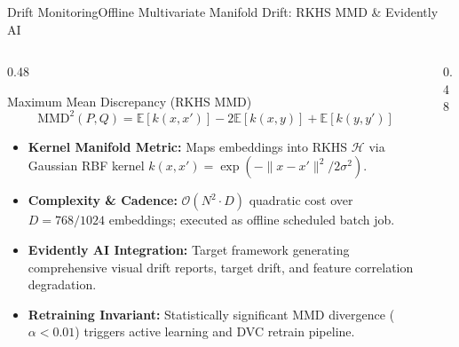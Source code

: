 \begin{frame}[fragile]{Drift Monitoring}{Offline Multivariate Manifold Drift: RKHS MMD \& Evidently AI}
    \begin{columns}[T]
        \begin{column}{0.48\textwidth}
            \begin{block}{Maximum Mean Discrepancy (RKHS MMD)}
                \vspace{-0.15cm}
                {\scriptsize $$\text{MMD}^2(P, Q) = \mathbb{E}[k(x,x')] - 2\mathbb{E}[k(x,y)] + \mathbb{E}[k(y,y')]$$}
                \vspace{-0.2cm}
                \begin{itemize}\tiny
                    \item \textbf{Kernel Manifold Metric:} Maps embeddings into RKHS $\mathcal{H}$ via Gaussian RBF kernel $k(x,x') = \exp(-\|x-x'\|^2 / 2\sigma^2)$.
                    \item \textbf{Complexity \& Cadence:} $\mathcal{O}(N^2 \cdot D)$ quadratic cost over $D=768/1024$ embeddings; executed as offline scheduled batch job.
                    \item \textbf{Evidently AI Integration:} Target framework generating comprehensive visual drift reports, target drift, and feature correlation degradation.
                    \item \textbf{Retraining Invariant:} Statistically significant MMD divergence ($\alpha < 0.01$) triggers active learning and DVC retrain pipeline.
                \end{itemize}
            \end{block}
        \end{column}
        \begin{column}{0.48\textwidth}
            \centering
\end{column}
\end{columns}
\end{frame}
